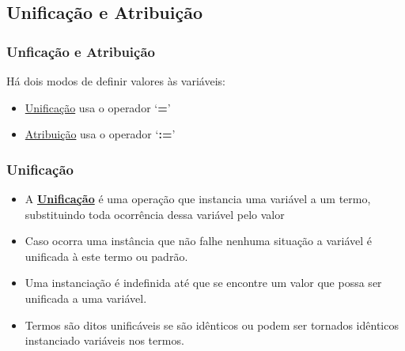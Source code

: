 
\subsection{Unificação e Atribuição}

\begin{frame} [fragile]
	\frametitle{Unficação e Atribuição}
	Há dois modos de definir valores às variáveis:
	
	\pause
	\begin{itemize}
	  \item \underline{Unificação} usa o operador 	`\textbf{=}'
	
		  \item \underline{Atribuição} usa o operador 	`\textbf{:=}'

	\end{itemize}
\end{frame}


\begin{frame}[fragile]
	\frametitle{Unificação}
	\begin{itemize}
		
		\item A \textbf{\underline{Unificação}} é uma operação que instancia uma variável a um termo, substituindo toda  ocorrência dessa variável pelo valor
		
		
		\pause
		\item Caso ocorra uma instância que não falhe nenhuma situação a variável é unificada à este termo
		ou padrão.
		
		\pause
		\item Uma instanciação é indefinida até que se encontre um valor que possa ser unificada a uma
		variável.
        
   		\pause
     \item Termos são ditos unificáveis se são idênticos ou podem ser tornados idênticos instanciado 
        variáveis nos termos.
		
	\end{itemize}
	
\end{frame}

